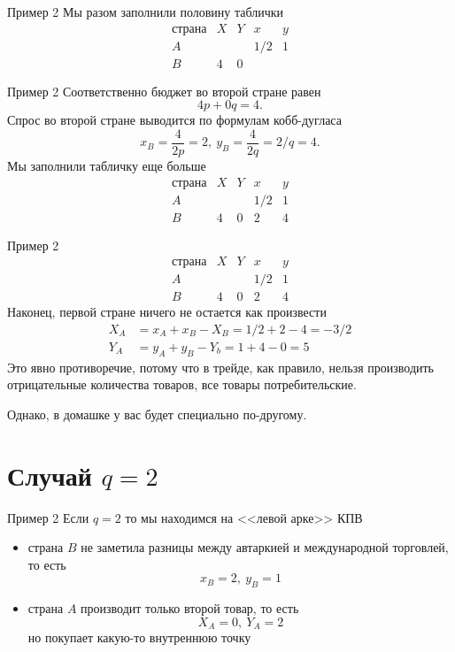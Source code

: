 \documentclass{beamer}
\begin{document}
\begin{frame}{Пример 2}
Мы разом заполнили половину таблички
$$\begin{array}{c|c|c|c|c}
  \text{страна} & X & Y & x & y \\
  \hline
  A & & & 1/2 & 1\\
  \hline
  B & 4 & 0 & &
\end{array}$$
\end{frame}

\begin{frame}{Пример 2}
Соответственно бюджет во второй стране равен $$4 p + 0 q = 4.$$ Спрос во второй стране выводится по формулам кобб-дугласа $$x_B = \frac{4}{2p} = 2, \ y_B = \frac{4}{2q} = 2/q = 4.$$
Мы заполнили табличку еще больше
$$\begin{array}{c|c|c|c|c}
  \text{страна} & X & Y & x & y \\
  \hline
  A & & & 1/2 & 1\\
  \hline
  B & 4 & 0 & 2 & 4
\end{array}$$
\end{frame}

\begin{frame}{Пример 2}
$$\begin{array}{c|c|c|c|c}
  \text{страна} & X & Y & x & y \\
  \hline
  A & & & 1/2 & 1\\
  \hline
  B & 4 & 0 & 2 & 4
\end{array}$$
Наконец, первой стране ничего не остается как произвести
\begin{align*}
	X_A & = x_A + x_B - X_B = 1/2 + 2 - 4 = -3/2\\
	Y_A & = y_A + y_B - Y_b = 1 + 4 - 0 = 5 
\end{align*}
Это явно противоречие, потому что \alert{в трейде, как правило, нельзя производить отрицательные количества товаров}, все товары потребительские. 

Однако, в домашке у вас будет специально по-другому. 
\end{frame}

\section{Случай $q = 2$}

\begin{frame}{Пример 2}
Если $q = 2$ то мы находимся на <<левой арке>> КПВ
\begin{itemize}
  \item страна $B$ не заметила разницы между автаркией и международной торговлей, то есть $$x_B = 2, \ y_B = 1$$
  \item страна $A$ производит только второй товар, то есть
 $$X_A = 0, \ Y_A = 2$$
 но покупает какую-то внутреннюю точку
\end{itemize}
\end{frame}
\end{document}
